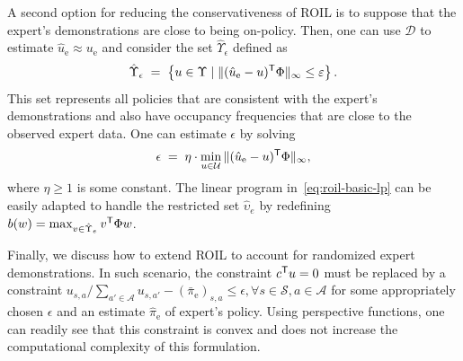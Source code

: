 \documentclass[10pt]{article}
\renewcommand{\cite}{\citep}
\theoremstyle{plain}
\theoremstyle{remark}
\begin{document}
A second option for reducing the conservativeness of ROIL is to suppose that the expert's demonstrations are close to being on-policy.
Then, one can use $\mathcal{D}$ to estimate $\hat{u}_{\mathrm{e}} \approx u_{\mathrm{e}}$ and consider the set $\hat{\Upsilon}_{\epsilon}$ defined as
%
\begin{equation}
\label{linf_constraint}
\hat{\Upsilon}_{\epsilon}
\;=\;
\left\{ u \in \Upsilon \mid \| (\hat{u}_{\mathrm{e}} - u)^{\mathsf{T}} \Phi \|_{\infty} \le \varepsilon \right\}.
\end{equation}
This set represents all policies that are consistent with the expert's demonstrations and also have occupancy frequencies that are close to the observed expert data. One can estimate $\epsilon$ by solving
\begin{equation}\label{eq:minimal-epsilon}
\epsilon \; =\;  \eta \cdot \min_{u\in \mathcal{U}}
\| (\hat{u}_{\mathrm{e}} - u)^{\mathsf{T}} \Phi \|_{\infty}, 
\end{equation}
where $\eta \ge 1$ is some constant. %
The linear program in~\eqref{eq:roil-basic-lp} can be easily adapted to handle the restricted set $\hat{\upsilon}_e$ by redefining $b(w) = \max_{v \in \hat{\Upsilon}_e} v^{\mathsf{T}} \Phi  w$. 

Finally, we discuss how to extend ROIL to account for randomized expert demonstrations. In such scenario, the constraint $c^{\mathsf{T}} u = 0$ must be replaced by a constraint $u_{s,a} / \sum_{a'\in \mathcal{A}} u_{s,a'} - (\bar{\pi}_{\mathrm{e}})_{s,a} \le \epsilon, \forall s\in \mathcal{S}, a\in \mathcal{A}$ for some appropriately chosen $\epsilon$ and an estimate $\hat{\pi}_{\mathrm{e}}$ of expert's policy. Using perspective functions, one can readily see that this constraint is convex and does not increase the computational complexity of this formulation.

\end{document}
